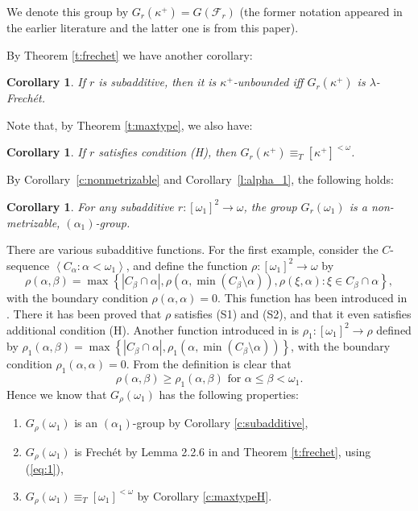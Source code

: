 \documentclass{amsart}
\theoremstyle{plain}
\newtheorem{corollary}[theorem]{Corollary}
\theoremstyle{definition}
\numberwithin{equation}{section}
\renewcommand{\a}{\alpha}
\renewcommand{\b}{\beta}
\renewcommand{\k}{\kappa}
\renewcommand{\o}{\omega}
\renewcommand{\l}{\lambda}
\newcommand{\seq}[1]{\left<#1\right>}
\newcommand{\set}[1]{\left\{#1\right\}}
\newcommand{\abs}[1]{\left\vert#1\right\vert}
\begin{document}
We denote this group by $G_{r}(\k^+)=G(\mathcal F_r)$ (the former notation appeared in the earlier literature and the latter one is from this paper).

By Theorem \ref{t:frechet} we have another corollary:

\begin{corollary}
	If $r$ is subadditive, then it is $\k^+$-unbounded iff $G_r(\k^+)$ is $\l$-Frech\'et.
\end{corollary}

Note that, by Theorem \ref{t:maxtype}, we also have:

\begin{corollary}
	If $r$ satisfies condition (H), then $G_r(\k^+)\equiv_T [\k^+]^{<\o}$.
\end{corollary}

By Corollary~\ref{c:nonmetrizable} and Corollary~\ref{l:alpha_1}, the following holds:

\begin{corollary}
	For any subadditive $r:[\o_1]^2\to\o$, the group $G_r(\o_1)$ is a non-metrizable, $(\a_1)$-group.
\end{corollary}

There are various subadditive functions.
For the first example, consider the $C$-sequence $\seq{C_{\a}:\a<\o_1}$, and define the function $\rho:[\o_1]^2\to \o$ by $$\rho(\a,\b)=\max\set{\abs{C_{\b}\cap\a},\rho(\a,\min(C_{\b}\setminus\a)),\rho(\xi,\a):\xi\in C_{\b}\cap\a},$$ with the boundary condition $\rho(\a,\a)=0$.
This function has been introduced in \cite[Section 3]{walks}.
There it has been proved that $\rho$ satisfies (S1) and (S2), and that it even satisfies additional condition (H).
Another function introduced in \cite{walks} is $\rho_1:[\o_1]^2\to\rho$ defined by $\rho_1(\a,\b)=\max\set{\abs{C_{\b}\cap\a},\rho_1(\a,\min(C_{\b}\setminus\a))}$, with the boundary condition $\rho_1(\a,\a)=0$.
From the definition is clear that \begin{equation}\label{eq:1}\rho(\a,\b)\ge\rho_1(\a,\b)\mbox{ for }\a\le\b<\o_1.\end{equation}
Hence we know that $G_{\rho}(\o_1)$ has the following properties:
\begin{enumerate}
	\item $G_{\rho}(\o_1)$ is an $(\alpha_1)$-group by Corollary \ref{c:subadditive},
	\item $G_{\rho}(\o_1)$ is Frech\'et by Lemma 2.2.6 in \cite{walks} and Theorem \ref{t:frechet}, using (\ref{eq:1}),
	\item $G_{\rho}(\o_1)\equiv_T [\o_1]^{<\o}$ by Corollary \ref{c:maxtypeH}.
\end{enumerate}
\end{document}
